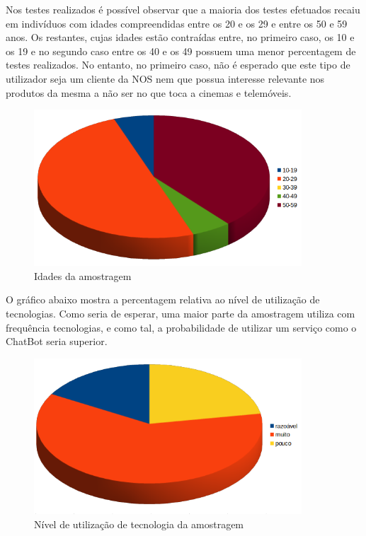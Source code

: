 \documentclass[11pt, a4paper]{article}
\begin{document}
Nos testes realizados é possível observar que a maioria dos testes efetuados recaiu em indivíduos com idades compreendidas entre os 20 e os 29 e entre os 50 e 59 anos. Os restantes, cujas idades estão contraídas entre, no primeiro caso, os 10 e os 19 e no segundo caso entre os 40 e os 49 possuem uma menor percentagem de testes realizados. No entanto, no primeiro caso, não é esperado que este tipo de utilizador seja um cliente da NOS nem que possua interesse relevante nos produtos da mesma a não ser no que toca a cinemas e telemóveis. 

    \begin{figure}[H]
        \centering
        \includegraphics[width=10cm]{images/guiaoR/idades_2.png}
        \caption{Idades da amostragem}
    \end{figure}


O gráfico abaixo mostra a percentagem relativa ao nível de utilização de tecnologias. Como seria de esperar, uma maior parte da amostragem utiliza com frequência tecnologias, e como tal, a probabilidade de utilizar um serviço como o ChatBot seria superior. 
    \begin{figure}[H]
        \centering
        \includegraphics[width=10cm]{images/guiaoR/usoTecnologias_2.png}
        \caption{Nível de utilização de tecnologia da amostragem}
    \end{figure}
    
\end{document}
